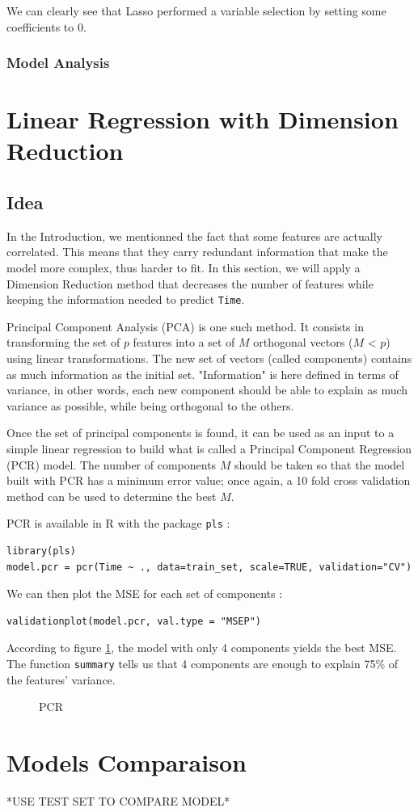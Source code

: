 \documentclass[]{report}
\newcommand{\inputtikz}[2]{%
	\scalebox{#1}{}  
}
\begin{document}
We can clearly see that Lasso performed a variable selection by setting some coefficients to 0.

\subsubsection{Model Analysis}

\section{Linear Regression with Dimension Reduction}
\subsection{Idea}
In the Introduction, we mentionned the fact that some features are actually correlated. This means that they carry redundant information that make the model more complex, thus harder to fit. In this section, we will apply a Dimension Reduction method that decreases the number of features while keeping the information needed to predict \texttt{Time}.

Principal Component Analysis (PCA) is one such method. It consists in transforming the set of $p$ features into a set of $M$ orthogonal vectors ($M$ < $p$) using linear transformations. The new set of vectors (called components) contains as much information as the initial set. "Information" is here defined in terms of variance, in other words, each new component should be able to explain as much variance as possible, while being orthogonal to the others.

Once the set of principal components is found, it can be used as an input to a simple linear regression to build what is called a Principal Component Regression (PCR) model. The number of components $M$ should be taken so that the model built with PCR has a minimum error value; once again, a 10 fold cross validation method can be used to determine the best $M$.

PCR is available in R with the package \texttt{pls} :
\begin{lstlisting}
library(pls)
model.pcr = pcr(Time ~ ., data=train_set, scale=TRUE, validation="CV")
\end{lstlisting}

We can then plot the MSE for each set of components :
\begin{lstlisting}
validationplot(model.pcr, val.type = "MSEP")
\end{lstlisting}

According to figure \ref{fig:pcr_cv}, the model with only 4 components yields the best MSE. The function \texttt{summary} tells us that 4 components are enough to explain 75\% of the features' variance. 

\begin{figure}[!h]
	\centering
	\inputtikz{0.5}{Figures/pcr_cv.tex}
	\caption{PCR}
	\label{fig:pcr_cv}
\end{figure}



\section{Models Comparaison}

*USE TEST SET TO COMPARE MODEL*
\end{document}
